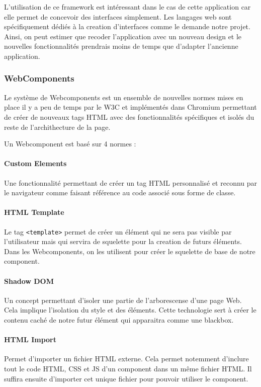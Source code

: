 L'utilisation de ce framework est intéressant dans le cas de cette application car elle permet de concevoir des interfaces simplement.
Les langages web sont spécifiquement dédiés à la creation d'interfaces comme le demande notre projet.
Ainsi, on peut estimer que recoder l'application avec un nouveau design et le nouvelles fonctionnalités prendrais moins de temps que d'adapter l'ancienne application.

\subsubsection{WebComponents}
\label{webcomponents}

Le système de Webcomponents est un ensemble de nouvelles normes mises en place il y a peu de temps par le W3C et implémentés dans Chromium permettant de créer de nouveaux tags HTML avec des fonctionnalités spécifiques et isolés du reste de l'archithecture de la page.

\bigskip

Un Webcomponent est basé sur 4 normes :

\paragraph{Custom Elements} Une fonctionnalité permettant de créer un tag HTML personnalisé et reconnu par le navigateur comme faisant référence au code associé sous forme de classe.

\paragraph{HTML Template} Le tag \texttt{<template>} permet de créer un élément qui ne sera pas visible par l'utilisateur mais qui servira de squelette pour la creation de futurs éléments.
Dans les Webcomponents, on les utilisent pour créer le squelette de base de notre component.

\paragraph{Shadow DOM} Un concept permettant d'isoler une partie de l'arborescense d'une page Web.
Cela implique l'isolation du style et des éléments.
Cette technologie sert à créer le contenu caché de notre futur élément qui apparaitra comme une blackbox.

\paragraph{HTML Import} Permet d'importer un fichier HTML externe.
Cela permet notemment d'inclure tout le code HTML, CSS et JS d'un component dans un même fichier HTML.
Il suffira ensuite d'importer cet unique fichier pour pouvoir utiliser le component.

